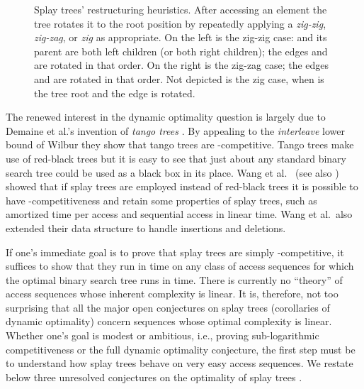 \documentclass{article}
\begin{document}
\begin{figure}[h!]
\begin{center}
\end{center}
\caption{\label{fig:zigzig-zigzag}Splay trees' restructuring heuristics.  After accessing an element  the tree rotates it to the root
position by repeatedly applying  a {\em zig-zig}, {\em zig-zag}, or {\em zig} as appropriate.
On the left is the zig-zig case:  and its parent  are both left children (or both right children); the edges
 and  are rotated in that order.  On the right is the zig-zag case; the edges  and  are
rotated in that order.  Not depicted is the zig case, when  is the tree root and the edge  is rotated.}
\end{figure}

The renewed interest in the dynamic optimality question is largely due to
Demaine et al.'s invention of {\em tango trees} \cite{DHIP04}.  
By appealing to the {\em interleave} lower bound of Wilbur \cite{Wilber89}
they show that tango trees are -competitive.  Tango trees make use of red-black trees
but it is easy to see that just about any standard binary search tree could be used as a black box in its place.
Wang et al.~\cite{WDS06} (see also \cite{Georg05}) showed that if splay trees are employed
instead of red-black trees it is possible to have -competitiveness and retain some properties
of splay trees, such as  amortized time per access and sequential access in linear time.  
Wang et al.~also extended their data structure to handle insertions and deletions.  

If one's immediate goal is to prove that splay trees are simply -competitive, it suffices to show that
they run in  time on any class of access sequences for which the optimal binary search tree runs in  time.
There is currently no ``theory'' of access sequences whose inherent complexity is linear.  It is, therefore, not too surprising that
all the major open conjectures on splay trees (corollaries of dynamic optimality)
concern sequences whose optimal complexity is linear.  
Whether one's goal is modest or ambitious, i.e., proving sub-logarithmic competitiveness or the full dynamic optimality conjecture,
the first step must be to understand how splay trees behave on very easy access sequences.
We restate below three unresolved conjectures on the optimality of splay trees \cite{Tar85,ST85,Lucas91}.
\end{document}
